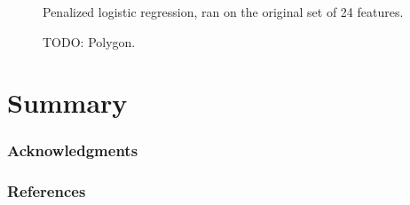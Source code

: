 \documentclass{article} %
\newcommand{\todo}[1]{}
\renewcommand{\todo}[1]{{\color{red} TODO: {#1}}}
\begin{document}
\begin{figure}[!t]
\center
\caption{Penalized logistic regression, ran on the original set of 24 features.}
\label{fig:penLLmisses}
\end{figure}


\begin{figure}[!t]
\center
\caption{\todo{Polygon.}}
\label{fig:polyErrors}
\end{figure}



\section{Summary}

\subsubsection*{Acknowledgments}

\subsubsection*{References}
\end{document}
